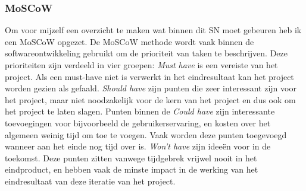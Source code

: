 \subsubsection*{MoSCoW}
Om voor mijzelf een overzicht te maken wat binnen dit SN moet gebeuren heb ik een MoSCoW opgezet. De MoSCoW methode wordt vaak binnen de softwareontwikkeling gebruikt om de prioriteit van taken te beschrijven. Deze prioriteiten zijn verdeeld in vier groepen: \textit{Must have} is een vereiste van het project. Als een must-have niet is verwerkt in het eindresultaat kan het project worden gezien als gefaald. \textit{Should have} zijn punten die zeer interessant zijn voor het project, maar niet noodzakelijk voor de kern van het project en dus ook om het project te laten slagen. Punten binnen de \textit{Could have} zijn interessante toevoegingen voor bijvoorbeeld de gebruikerservaring, en kosten over het algemeen weinig tijd om toe te voegen. Vaak worden deze punten toegevoegd wanneer aan het einde nog tijd over is. \textit{Won't have} zijn ideeën voor in de toekomst. Deze punten zitten vanwege tijdgebrek vrijwel nooit in het eindproduct, en hebben vaak de minste impact in de werking van het eindresultaat van deze iteratie van het project.

\noindent{}

